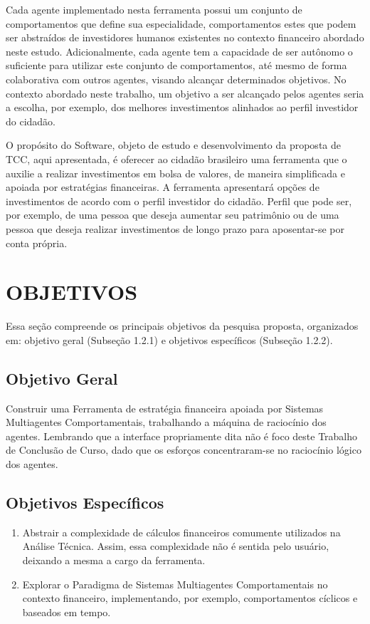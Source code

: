 Cada agente implementado nesta ferramenta possui um conjunto de comportamentos que define sua especialidade, comportamentos estes que podem ser abstraídos de investidores humanos existentes no contexto financeiro abordado neste estudo. Adicionalmente, cada agente tem a capacidade de ser autônomo o suficiente para utilizar este conjunto de comportamentos, até mesmo de forma colaborativa com outros agentes, visando alcançar determinados objetivos. No contexto abordado neste trabalho, um objetivo a ser alcançado pelos agentes seria a escolha, por exemplo, dos melhores investimentos alinhados ao perfil investidor do cidadão.

O propósito do Software, objeto de estudo e desenvolvimento da proposta de TCC, aqui apresentada, é oferecer ao cidadão brasileiro uma ferramenta que o auxilie a realizar investimentos em bolsa de valores, de maneira simplificada e apoiada por estratégias financeiras. A ferramenta apresentará opções de investimentos de acordo com o perfil investidor do cidadão. Perfil que pode ser, por exemplo, de uma pessoa que deseja aumentar seu patrimônio ou de uma pessoa que deseja realizar investimentos de longo prazo para aposentar-se por conta própria.

\section{OBJETIVOS}

Essa seção compreende os principais objetivos da pesquisa proposta, organizados em: objetivo geral (Subseção 1.2.1) e objetivos específicos (Subseção 1.2.2).


\subsection {Objetivo Geral}

Construir uma Ferramenta de estratégia financeira apoiada por Sistemas Multiagentes Comportamentais, trabalhando a máquina de raciocínio dos agentes. Lembrando que a interface propriamente dita não é foco deste Trabalho de Conclusão de Curso, dado que os esforços  concentraram-se no raciocínio lógico dos agentes.


\subsection {Objetivos Específicos}

\begin{enumerate}
\item Abstrair a complexidade de cálculos financeiros comumente utilizados na Análise Técnica. Assim, essa complexidade não é sentida pelo usuário, deixando a mesma a cargo da ferramenta.
\item Explorar o Paradigma de Sistemas Multiagentes Comportamentais no contexto financeiro, implementando, por exemplo, comportamentos cíclicos e baseados em tempo.
\end{enumerate}


